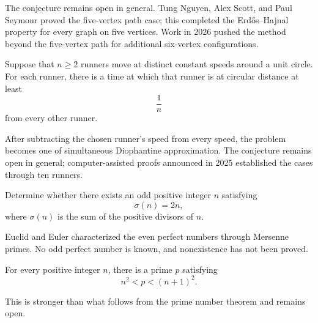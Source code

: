     \begin{remark}
        The conjecture remains open in general. Tung Nguyen, Alex Scott, and
        Paul Seymour proved the five-vertex path case; this completed the
        Erd\H{o}s--Hajnal property for every graph on five vertices. Work in 2026
        pushed the method beyond the five-vertex path for additional six-vertex
        configurations.
    \end{remark}

    \begin{conjecture}
        Suppose that $n\geq 2$ runners move at distinct constant speeds around a
        unit circle. For each runner, there is a time at which that runner is at
        circular distance at least
        \[
            \frac{1}{n}
        \]
        from every other runner.
    \end{conjecture}

    \begin{remark}
        After subtracting the chosen runner's speed from every speed, the
        problem becomes one of simultaneous Diophantine approximation. The
        conjecture remains open in general; computer-assisted proofs announced
        in 2025 established the cases through ten runners.
    \end{remark}

    \begin{openproblem}
        Determine whether there exists an odd positive integer $n$ satisfying
        \[
            \sigma(n)=2n,
        \]
        where $\sigma(n)$ is the sum of the positive divisors of $n$.
    \end{openproblem}

    \begin{remark}
        Euclid and Euler characterized the even perfect numbers through Mersenne
        primes. No odd perfect number is known, and nonexistence has not been
        proved.
    \end{remark}

    \begin{conjecture}
        For every positive integer $n$, there is a prime $p$ satisfying
        \[
            n^2<p<(n+1)^2.
        \]
    \end{conjecture}

    \begin{remark}
        This is stronger than what follows from the prime number theorem and
        remains open.
    \end{remark}

